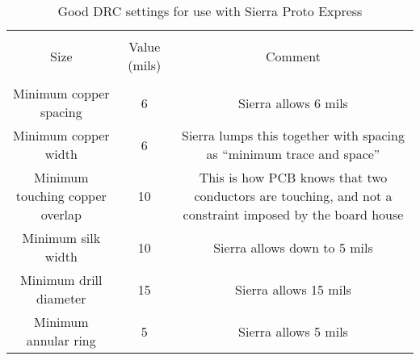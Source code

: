 \begin{table}[htb]
\begin{center}
\begin{tabular}{|c|c|c|}\hline
&&\\
Size	&Value (mils)	&Comment\\
&&\\ \hline \hline

\parbox[c][1.5\height][c]{5cm}{Minimum copper spacing}
&6
&\parbox[c][1.5\height][c]{5cm}{Sierra allows 6 mils}\\ \hline

\parbox[c][1.5\height][c]{5cm}{Minimum copper width}
&6
&\parbox[c][1.5\height][c]{5cm}{Sierra lumps this together with spacing as ``minimum trace and space''}\\ \hline

\parbox[c][1.5\height][c]{5cm}{Minimum touching copper overlap}
&10
&\parbox[c][1.5\height][c]{5cm}{This is how PCB knows that two conductors are touching, and not a constraint imposed by the board house}\\ \hline

\parbox[c][1.5\height][c]{5cm}{Minimum silk width}
&10
&\parbox[c][1.5\height][c]{5cm}{Sierra allows down to 5 mils}\\ \hline

\parbox[c][1.5\height][c]{5cm}{Minimum drill diameter}
&15
&\parbox[c][1.5\height][c]{5cm}{Sierra allows 15 mils}\\ \hline

\parbox[c][1.5\height][c]{5cm}{Minimum annular ring}
&5
&\parbox[c][1.5\height][c]{5cm}{Sierra allows 5 mils}\\ \hline

\end{tabular}
\end{center}
\caption{Good DRC settings for use with Sierra Proto Express\label{sierra_drc}}
\end{table}

